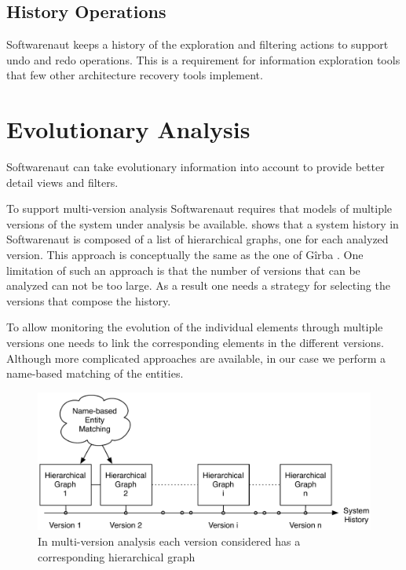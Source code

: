 \documentclass[preprint,12pt]{elsarticle}
\begin{document}
\subsection {History Operations} Softwarenaut keeps a history of the exploration and filtering actions to support undo and redo operations. This is a requirement for information exploration tools \cite{shneid-eyes} that few other architecture recovery tools implement.

\section {Evolutionary Analysis}

Softwarenaut can take evolutionary information into account to provide better detail views and filters.

To support multi-version analysis Softwarenaut requires that models of multiple versions of the system under analysis be available.  shows that a system history in Softwarenaut is composed of a list of hierarchical graphs, one for each analyzed version. This approach is conceptually the same as the one of G{\^i}rba \cite{girba-thesis}. One limitation of such an approach is that the number of versions that can be analyzed can not be too large. As a result one needs a strategy for selecting the versions that compose the history.

To allow monitoring the evolution of the individual elements through multiple versions one needs to link the corresponding elements in the different versions. Although more complicated approaches are available, in our case we perform a name-based matching of the entities.

\begin{figure}[h]
\begin{center}
\includegraphics[width=\linewidth]{images/MultiVersionAnalysis}
\caption{In multi-version analysis each version considered has a corresponding hierarchical graph}
\end{center}
\end{figure}
\end{document}
